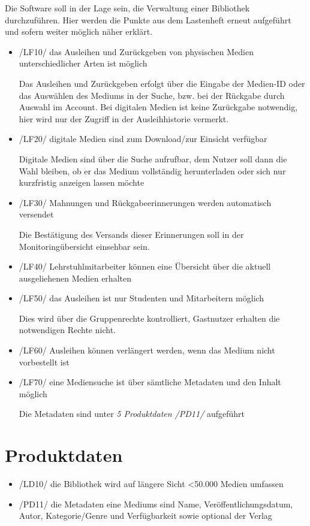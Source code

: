 \documentclass[12pt, a4paper]{article}
\begin{document}
Die Software soll in der Lage sein, die Verwaltung einer Bibliothek durchzuführen. Hier werden die Punkte aus dem Lastenheft erneut aufgeführt und sofern weiter möglich näher erklärt.
\begin{itemize}
	\item /LF10/ das Ausleihen und Zurückgeben von physischen Medien unterschiedlicher Arten ist möglich 
	
		Das Ausleihen und Zurückgeben erfolgt über die Eingabe der Medien-ID oder das Auswählen des Mediums in der Suche, bzw. bei der Rückgabe durch Auswahl im Account.
		Bei digitalen Medien ist keine Zurückgabe notwendig, hier wird nur der Zugriff in der Ausleihhistorie vermerkt.
	\item /LF20/ digitale Medien sind zum Download/zur Einsicht verfügbar 
	
	Digitale Medien sind über die Suche aufrufbar, dem Nutzer soll dann die Wahl bleiben, ob er das Medium vollständig herunterladen oder sich nur kurzfristig anzeigen lassen möchte
	\item /LF30/ Mahnungen und Rückgabeerinnerungen werden automatisch versendet 
	
	Die Bestätigung des Versands dieser Erinnerungen soll in der Monitoringübersicht einsehbar sein.
	
	\item /LF40/ Lehrstuhlmitarbeiter können eine Übersicht über die aktuell ausgeliehenen Medien erhalten 
	
	\item /LF50/ das Ausleihen ist nur Studenten und Mitarbeitern möglich 
	
	Dies wird über die Gruppenrechte kontrolliert, Gastnutzer erhalten die notwendigen Rechte nicht.
	\item /LF60/ Ausleihen können verlängert werden, wenn das Medium nicht vorbestellt ist
	\item /LF70/ eine Mediensuche ist über sämtliche Metadaten und den Inhalt möglich 
	
	Die Metadaten sind unter \textit{5 Produktdaten /PD11/} aufgeführt
\end{itemize}
\pagebreak

\section{Produktdaten}
\begin{itemize}
	\item /LD10/ die Bibliothek wird auf längere Sicht <50.000 Medien umfassen
	\item /PD11/ die Metadaten eine Mediums sind Name, Veröffentlichungsdatum, Autor, Kategorie/Genre und Verfügbarkeit sowie optional der Verlag 
\end{itemize}
\end{document}
